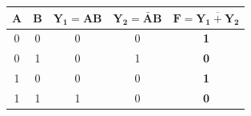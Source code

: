 \documentclass[12pt, a4paper]{article}
\begin{document}
																																																																																																
																																																																																																	\vspace{0.5cm}
																																																																																																	\begin{truthtablebox}
																																																																																																	    \begin{center}
																																																																																																	            \renewcommand{\arraystretch}{1.4}
																																																																																																		            \setlength{\tabcolsep}{15pt}
																																																																																																			            \begin{tabular}{|c|c||c|c||c|}
																																																																																																				                \hline
																																																																																																						            \textbf{A} & \textbf{B} & $\mathbf{Y_1 = AB}$ & $\mathbf{Y_2 = \bar{A}B}$ & $\mathbf{F = \overline{Y_1 + Y_2}}$ \\
																																																																																																							                \hline
																																																																																																									            0 & 0 & 0 & 0 & \textbf{1} \\
																																																																																																										                0 & 1 & 0 & 1 & \textbf{0} \\
																																																																																																												            1 & 0 & 0 & 0 & \textbf{1} \\
																																																																																																													                1 & 1 & 1 & 0 & \textbf{0} \\
																																																																																																															            \hline
																																																																																																																            \end{tabular}
																																																																																																																	        \end{center}
																																																																																																																		\end{truthtablebox}
\end{document}
